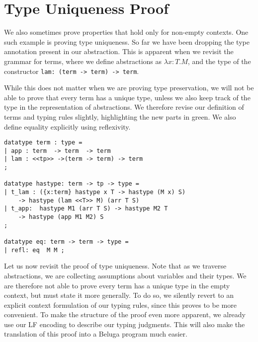 





\section{Type Uniqueness Proof}
We also sometimes prove properties that hold only for non-empty
contexts. One such example is proving type uniqueness. So far we have
been dropping the type annotation present in our abstraction. This is
apparent when we revisit the grammar for terms, where we define
abstractions as $\lambda x{:}T.M$, and the type of the constructor
\lstinline!lam: (term -> term) -> term!.

While this does not matter when we are proving type preservation, we
will not be able to prove that every term has a unique type, unless we
also keep track of the type in the representation of abstractions. We
therefore revise our definition of terms and typing rules slightly,
highlighting the new parts in green. We also define equality
explicitly using reflexivity.

\begin{lstlisting}
datatype term : type =
| app : term  -> term  -> term
| lam : <<tp>> ->(term -> term) -> term
;

datatype hastype: term -> tp -> type =
| t_lam : ({x:term} hastype x T -> hastype (M x) S)
	-> hastype (lam <<T>> M) (arr T S)
| t_app:  hastype M1 (arr T S) -> hastype M2 T
	-> hastype (app M1 M2) S
;

datatype eq: term -> term -> type =
| refl: eq  M M ;
\end{lstlisting}

Let us now revisit the proof of type uniqueness. Note that as we traverse
abstractions, we are collecting assumptions about variables and their
types. We are therefore not able to prove every term has a unique type
in the empty context, but must state it more generally. To do so, we
silently revert to an explicit context formulation of our typing
rules, since this proves to be more convenient. To make the structure
of the proof even more apparent, we already use our LF encoding to
describe our typing judgments. This will also make the translation of
this proof into a Beluga program much easier.

